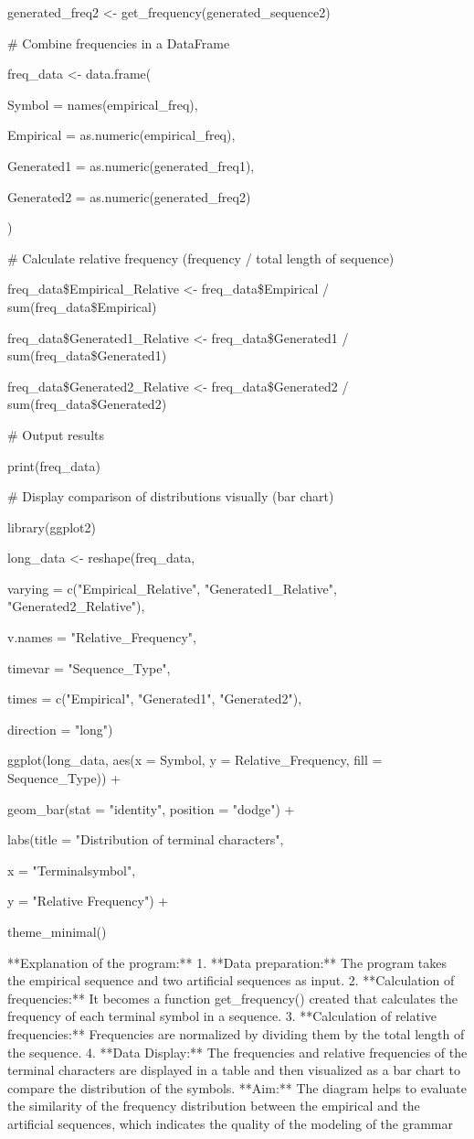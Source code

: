 \documentclass[
]{article}
\begin{document}
generated\_freq2 \textless- get\_frequency(generated\_sequence2)

\# Combine frequencies in a DataFrame

freq\_data \textless- data.frame(

Symbol = names(empirical\_freq),

Empirical = as.numeric(empirical\_freq),

Generated1 = as.numeric(generated\_freq1),

Generated2 = as.numeric(generated\_freq2)

)

\# Calculate relative frequency (frequency / total length of sequence)

freq\_data\$Empirical\_Relative \textless- freq\_data\$Empirical /
sum(freq\_data\$Empirical)

freq\_data\$Generated1\_Relative \textless- freq\_data\$Generated1 /
sum(freq\_data\$Generated1)

freq\_data\$Generated2\_Relative \textless- freq\_data\$Generated2 /
sum(freq\_data\$Generated2)

\# Output results

print(freq\_data)

\# Display comparison of distributions visually (bar chart)

library(ggplot2)

long\_data \textless- reshape(freq\_data,

varying = c("Empirical\_Relative", "Generated1\_Relative",
"Generated2\_Relative"),

v.names = "Relative\_Frequency",

timevar = "Sequence\_Type",

times = c("Empirical", "Generated1", "Generated2"),

direction = "long")

ggplot(long\_data, aes(x = Symbol, y = Relative\_Frequency, fill =
Sequence\_Type)) +

geom\_bar(stat = "identity", position = "dodge") +

labs(title = "Distribution of terminal characters",

x = "Terminalsymbol",

y = "Relative Frequency") +

theme\_minimal()

**Explanation of the program:** 1. **Data preparation:** The program
takes the empirical sequence and two artificial sequences as input. 2.
**Calculation of frequencies:** It becomes a function get\_frequency()
created that calculates the frequency of each terminal symbol in a
sequence. 3. **Calculation of relative frequencies:** Frequencies are
normalized by dividing them by the total length of the sequence. 4.
**Data Display:** The frequencies and relative frequencies of the
terminal characters are displayed in a table and then visualized as a
bar chart to compare the distribution of the symbols. **Aim:** The
diagram helps to evaluate the similarity of the frequency distribution
between the empirical and the artificial sequences, which indicates the
quality of the modeling of the grammar
\end{document}
